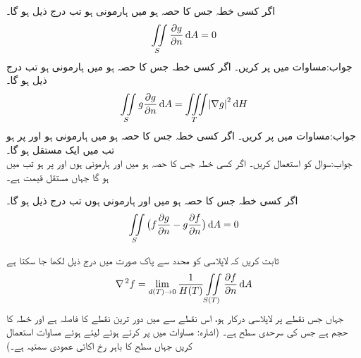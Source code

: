 \quad اگر کسی خطہ جس کا  حصہ ہو  میں  ہارمونی ہو تب درج ذیل ہو گا۔
\begin{align*}
\iint\limits_S \frac{\partial g}{\partial n}\dif A=0
\end{align*}
جواب:\quad مساوات  میں  پر کریں۔
\quad اگر کسی خطہ جس کا  حصہ ہو  میں  ہارمونی ہو تب درج ذیل ہو گا۔
\begin{align*}
\iint\limits_S g\frac{\partial g}{\partial n}\dif A=\iiint \limits_T \abs{\nabla g}^2 \dif H
\end{align*}
جواب:\quad مساوات  میں  پر کریں۔
\quad اگر کسی خطہ جس کا  حصہ ہو  میں  ہارمونی ہو  اور  پر   ہو  تب  میں  ایک مستقل ہو گا۔ \\
جواب:\quad سوال  کو استعمال کریں۔
\quad  اگر کسی خطہ جس کا  حصہ ہو  میں  اور  ہارمونی ہوں اور  پر  ہو تب  میں  ہو گا جہاں  مستقل قیمت ہے۔

\quad  اگر کسی خطہ جس کا  حصہ ہو  میں  اور  ہارمونی ہوں تب درج ذیل ہو گا۔
\begin{align*}
\iint\limits_S \big(f\frac{\partial g}{\partial n}-g\frac{\partial f}{\partial n}\big)\dif A=0
\end{align*}

\quad ثابت کریں کہ لاپلاسی کو محدد سے پاک صورت میں درج ذیل لکھا جا سکتا ہے
\begin{align*}
\nabla^{\,2}f=\lim_{d(T)\to 0}\frac{1}{H(T)}\iint\limits_{S(T)} \frac{\partial f}{\partial n}\dif A
\end{align*}
جہاں جس نقطے پر لاپلاسی درکار ہو، اس نقطے سے  میں دور ترین نقطے کا فاصلہ  ہے اور  خطہ  کا حجم ہے جس کی سرحدی سطح  ہے۔ (اشارہ: مساوات  میں  پر کرتے ہوئے  لیتے ہوئے مساوات  استعمال کریں جہاں  سطح  کا باہر رخ اکائی عمودی سمتیہ ہے۔)

